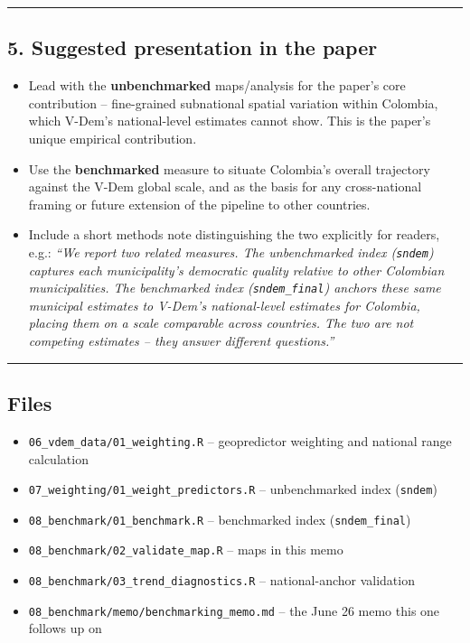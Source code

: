 \documentclass[
]{article}
\providecommand{\tightlist}{%
  \setlength{\itemsep}{0pt}\setlength{\parskip}{0pt}}
\begin{document}
\begin{center}\rule{0.5\linewidth}{0.5pt}\end{center}

\hypertarget{suggested-presentation-in-the-paper}{%
\subsection{5. Suggested presentation in the
paper}\label{suggested-presentation-in-the-paper}}

\begin{itemize}
\tightlist
\item
  Lead with the \textbf{unbenchmarked} maps/analysis for the paper's
  core contribution -- fine-grained subnational spatial variation within
  Colombia, which V-Dem's national-level estimates cannot show. This is
  the paper's unique empirical contribution.
\item
  Use the \textbf{benchmarked} measure to situate Colombia's overall
  trajectory against the V-Dem global scale, and as the basis for any
  cross-national framing or future extension of the pipeline to other
  countries.
\item
  Include a short methods note distinguishing the two explicitly for
  readers, e.g.: \emph{``We report two related measures. The
  unbenchmarked index (\texttt{sndem}) captures each municipality's
  democratic quality relative to other Colombian municipalities. The
  benchmarked index (\texttt{sndem\_final}) anchors these same municipal
  estimates to V-Dem's national-level estimates for Colombia, placing
  them on a scale comparable across countries. The two are not competing
  estimates -- they answer different questions.''}
\end{itemize}

\begin{center}\rule{0.5\linewidth}{0.5pt}\end{center}

\hypertarget{files}{%
\subsection{Files}\label{files}}

\begin{itemize}
\tightlist
\item
  \texttt{06\_vdem\_data/01\_weighting.R} -- geopredictor weighting and
  national range calculation
\item
  \texttt{07\_weighting/01\_weight\_predictors.R} -- unbenchmarked index
  (\texttt{sndem})
\item
  \texttt{08\_benchmark/01\_benchmark.R} -- benchmarked index
  (\texttt{sndem\_final})
\item
  \texttt{08\_benchmark/02\_validate\_map.R} -- maps in this memo
\item
  \texttt{08\_benchmark/03\_trend\_diagnostics.R} -- national-anchor
  validation
\item
  \texttt{08\_benchmark/memo/benchmarking\_memo.md} -- the June 26 memo
  this one follows up on
\end{itemize}
\end{document}
